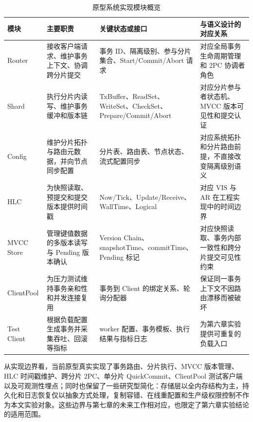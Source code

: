 \begin{table}[htbp]
      \centering
      \small
      \renewcommand{\arraystretch}{1.25}
      \caption{原型系统实现模块概览}
      \label{tab:prototype-implementation-overview}
      \begin{tabularx}{\textwidth}{p{2.2cm} p{3.0cm} p{3.2cm} X}
            \toprule
            模块          & 主要职责                       & 关键状态或接口                                                 & 与语义设计的对应关系                                \\
            \midrule
            Router      & 接收客户端请求、维护事务上下文、协调跨分片提交    & 事务 ID、隔离级别、参与分片集合、Start/Commit/Abort 请求                 & 对应全局事务生命周期管理和 2PC 协调者角色                   \\
            Shard       & 执行分片内读写、维护事务缓冲和版本链         & TxBuffer、ReadSet、WriteSet、CheckSet、Prepare/Commit/Abort & 对应分片参与者状态机、MVCC 版本可见性和提交认证                \\
            Config      & 维护分片拓扑与路由元数据，并向节点同步配置      & 分片表、路由表、节点状态、流式配置同步                                     & 对应系统拓扑和分片路由前提，不直接改变隔离级别语义                 \\
            HLC         & 为快照读取、预提交和提交版本提供时间戳        & Now/Tick、Update/Receive、WallTime、Logical                & 对应 $\text{VIS}$ 与 $\text{AR}$ 在工程实现中的时间边界 \\
            MVCC Store  & 管理键值数据的多版本读写与 Pending 版本确认 & Version Chain、snapshotTime、commitTime、Pending 标记        & 对应快照读取、事务内部一致性和跨分片提交可见性约束                 \\
            ClientPool  & 为压力测试维持事务亲和性和并发连接复用        & 事务到 Client 的绑定关系、轮询分配器                                  & 保证同一事务上下文不因路由漂移而被破坏                       \\
            Test Client & 根据负载配置生成事务并采集吞吐、回滚等指标      & worker 配置、事务模板、执行结果与指标日志                                & 为第六章实验提供可重复的负载入口                          \\
            \bottomrule
      \end{tabularx}
\end{table}

从实现边界看，当前原型真实实现了事务路由、分片执行、MVCC 版本管理、HLC 时间戳维护、跨分片 2PC、单分片 QuickCommit、ClientPool 测试客户端以及可观测性埋点；同时也保留了一些研究型简化：存储层以全内存结构为主，持久化和日志恢复仅以抽象方式处理，复制容错、在线重配置和生产级权限控制不作为本文实验对象。这些边界与第七章的未来工作相对应，也限定了第六章实验结论的适用范围。

